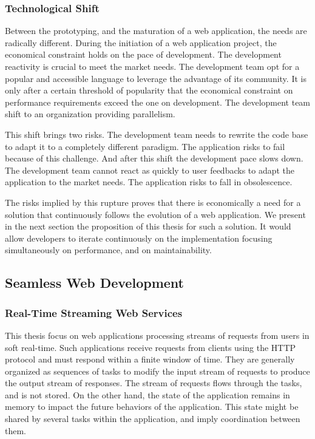 \subsubsection{Technological Shift}

Between the prototyping, and the maturation of a web application, the needs are radically different.
During the initiation of a web application project, the economical constraint holds on the pace of development.
The development reactivity is crucial to meet the market needs.
The development team opt for a popular and accessible language to leverage the advantage of its community.
It is only after a certain threshold of popularity that the  economical constraint on performance requirements exceed the one on development.
The development team shift to an organization providing parallelism.

This shift brings two risks.
The development team needs to rewrite the code base to adapt it to a completely different paradigm.
The application risks to fail because of this challenge.
And after this shift the development pace slows down.
The development team cannot react as quickly to user feedbacks to adapt the application to the market needs.
The application risks to fall in obsolescence.

The risks implied by this rupture proves that there is economically a need for a solution that continuously follows the evolution of a web application.
We present in the next section the proposition of this thesis for such a solution.
It would allow developers to iterate continuously on the implementation focusing simultaneously on performance, and on maintainability.





\subsection{Seamless Web Development}


\subsubsection{Real-Time Streaming Web Services}

This thesis focus on web applications processing streams of requests from users in soft real-time.
Such applications receive requests from clients using the HTTP protocol and must respond within a finite window of time.
They are generally organized as sequences of tasks to modify the input stream of requests to produce the output stream of responses.
The stream of requests flows through the tasks, and is not stored.
On the other hand, the state of the application remains in memory to impact the future behaviors of the application.
This state might be shared by several tasks within the application, and imply coordination between them.

